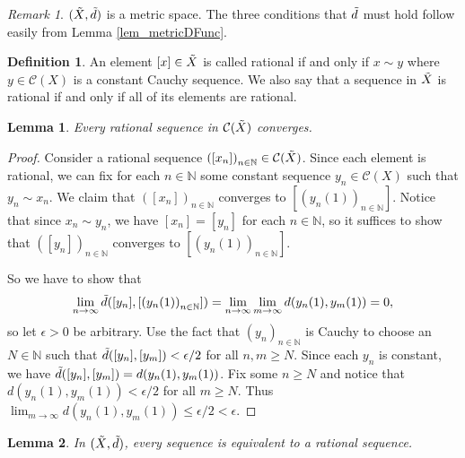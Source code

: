 \documentclass{report}
\newtheorem{lemma}{Lemma}[section]
\theoremstyle{definition}
\newtheorem{definition}{Definition}[section]
\theoremstyle{remark}
\newtheorem{remark}{Remark}[section]
\newcommand{\N}{\mathbb{N}}
\newcommand{\seq}[2][n \in \N]{\left( #2 \right)_{#1}}
\newcommand{\prt}[1]{\mathcal{#1}}
\begin{document}
\begin{remark}
     $(\Tilde{X}, \Tilde{d})$ is a metric space. The three conditions that $\Tilde{d}$ must hold follow easily from Lemma \ref{lem_metricDFunc}.
\end{remark}

\begin{definition}
   An element $[x] \in \Tilde{X}$ is called rational if and only if $x \sim y$ where $y \in \prt{C}(X)$ is a constant Cauchy sequence. We also say that a sequence in $\Tilde{X}$ is rational if and only if all of its elements are rational.
\end{definition}

\begin{lemma} \label{lem_rationalSequencesConverge}
    Every rational sequence in $\prt{C}(\Tilde{X})$ converges.
\end{lemma}

\begin{proof}
    Consider a rational sequence $\seq{[x_n]} \in \prt{C}(\Tilde{X})$. Since each element is rational, we can fix for each $n \in \N$ some constant sequence $y_n \in \prt{C}(X)$ such that $y_n \sim x_n$. We claim that $\seq{[x_n]}$ converges to $[\seq{y_n(1)}]$. Notice that since $x_n \sim y_n$, we have $[x_n] = [y_n]$ for each $n \in \N$, so it suffices to show that $\seq{[y_n]}$ converges to $[\seq{y_n(1)}]$.
    
    So we have to show that 
    \begin{equation*}
        \lim_{n \to \infty} \Tilde{d}([y_n], [\seq{y_n(1)}]) = \lim_{n \to \infty} \lim_{m \to \infty} 
        d(y_n(1), y_m(1)) = 0,
    \end{equation*} so let $\epsilon > 0$ be arbitrary. Use the fact that $\seq{y_n}$ is Cauchy to choose an $N \in \N$ such that $\Tilde{d}([y_n], [y_m]) < \epsilon/2$ for all $n,m \geq N$. Since each $y_n$ is constant, we have $\Tilde{d}([y_n], [y_m]) = d(y_n(1), y_m(1))$. Fix some $n \geq N$ and notice that $d(y_n(1), y_m(1)) < \epsilon/2$ for all $m \geq N$. Thus $\lim_{m \to \infty} d(y_n(1), y_m(1)) \leq \epsilon/2 < \epsilon$.
    
\end{proof}

\begin{lemma} \label{lem_cauchySequenceEquivToRationalSequence}
    In $(\Tilde{X}, \Tilde{d})$, every sequence is equivalent to a rational sequence.
\end{lemma}
\end{document}
